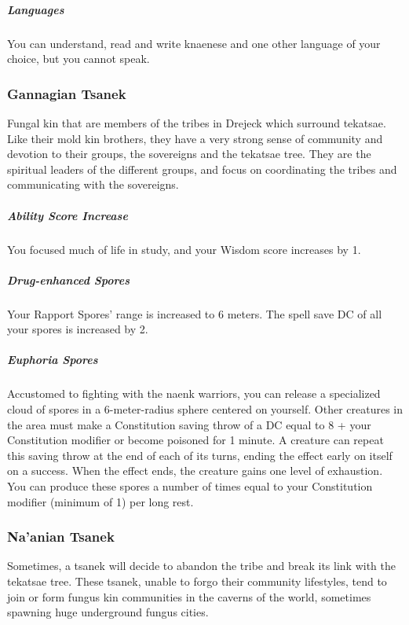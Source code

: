     \subparagraph{Languages} You can understand, read and write knaenese and one other language of your choice, but you cannot speak.


\subsubsection{Gannagian Tsanek}
    Fungal kin that are members of the tribes in Drejeck which surround tekatsae.
    Like their mold kin brothers, they have a very strong sense of community and devotion to their groups, the sovereigns and the tekatsae tree.
    They are the spiritual leaders of the different groups, and focus on coordinating the tribes and communicating with the sovereigns.

    \subparagraph{Ability Score Increase} You focused much of life in study, and your Wisdom score increases by 1.

    \subparagraph{Drug-enhanced Spores} Your Rapport Spores' range is increased to 6 meters.
    The spell save DC of all your spores is increased by 2.

    \subparagraph{Euphoria Spores} Accustomed to fighting with the naenk warriors, you can release a specialized cloud of spores in a 6-meter-radius sphere centered on yourself.
    Other creatures in the area must make a Constitution saving throw of a DC equal to 8 + your Constitution modifier or become poisoned for 1 minute.
    A creature can repeat this saving throw at the end of each of its turns, ending the effect early on itself on a success.
    When the effect ends, the creature gains one level of exhaustion.
    You can produce these spores a number of times equal to your Constitution modifier (minimum of 1) per long rest.

\subsubsection{Na'anian Tsanek}
    Sometimes, a tsanek will decide to abandon the tribe and break its link with the tekatsae tree.
    These tsanek, unable to forgo their community lifestyles, tend to join or form fungus kin communities in the caverns of the world, sometimes spawning huge underground fungus cities.

